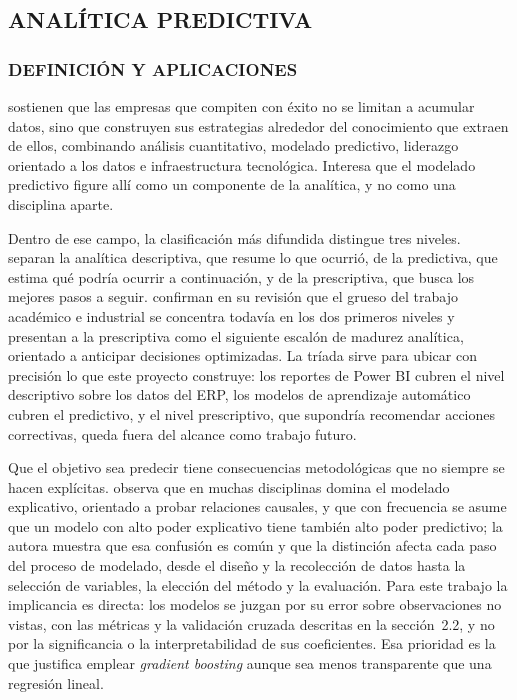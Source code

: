 \subsection{ANALÍTICA PREDICTIVA}
\subsubsection{DEFINICIÓN Y APLICACIONES}

\textcite{Davenport2007} sostienen que las empresas que compiten con éxito no se limitan a acumular datos, sino que construyen sus estrategias alrededor del conocimiento que extraen de ellos, combinando análisis cuantitativo, modelado predictivo, liderazgo orientado a los datos e infraestructura tecnológica. Interesa que el modelado predictivo figure allí como un componente de la analítica, y no como una disciplina aparte.

Dentro de ese campo, la clasificación más difundida distingue tres niveles. \textcite{Delen2013} separan la analítica descriptiva, que resume lo que ocurrió, de la predictiva, que estima qué podría ocurrir a continuación, y de la prescriptiva, que busca los mejores pasos a seguir. \textcite{Lepenioti2020} confirman en su revisión que el grueso del trabajo académico e industrial se concentra todavía en los dos primeros niveles y presentan a la prescriptiva como el siguiente escalón de madurez analítica, orientado a anticipar decisiones optimizadas. La tríada sirve para ubicar con precisión lo que este proyecto construye: los reportes de Power BI cubren el nivel descriptivo sobre los datos del ERP, los modelos de aprendizaje automático cubren el predictivo, y el nivel prescriptivo, que supondría recomendar acciones correctivas, queda fuera del alcance como trabajo futuro.

Que el objetivo sea predecir tiene consecuencias metodológicas que no siempre se hacen explícitas. \textcite{Shmueli2010} observa que en muchas disciplinas domina el modelado explicativo, orientado a probar relaciones causales, y que con frecuencia se asume que un modelo con alto poder explicativo tiene también alto poder predictivo; la autora muestra que esa confusión es común y que la distinción afecta cada paso del proceso de modelado, desde el diseño y la recolección de datos hasta la selección de variables, la elección del método y la evaluación. Para este trabajo la implicancia es directa: los modelos se juzgan por su error sobre observaciones no vistas, con las métricas y la validación cruzada descritas en la sección~2.2, y no por la significancia o la interpretabilidad de sus coeficientes. Esa prioridad es la que justifica emplear \textit{gradient boosting} aunque sea menos transparente que una regresión lineal.

